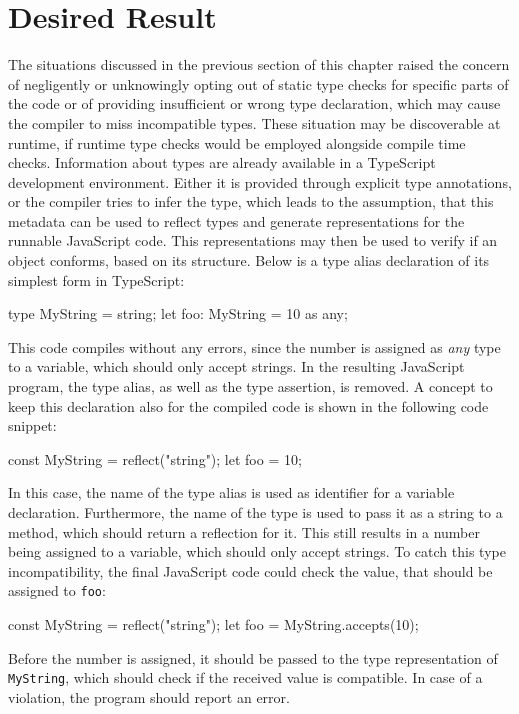 

\section{Desired Result}
\label{sec:desired-result}

The situations discussed in the previous section of this chapter raised the concern of negligently or unknowingly opting out of static type checks for specific parts of the code or of providing insufficient or wrong type declaration, which may cause the compiler to miss incompatible types. These situation may be discoverable at runtime, if runtime type checks would be employed alongside compile time checks. Information about types are already available in a TypeScript development environment. Either it is provided through explicit type annotations, or the compiler tries to infer the type, which leads to the assumption, that this metadata can be used to reflect types and generate representations for the runnable JavaScript code. This representations may then be used to verify if an object conforms, based on its structure. Below is a type alias declaration of its simplest form in TypeScript:
\begin{JsCode}[numbers=none]
type MyString = string;
let foo: MyString = 10 as any;
\end{JsCode}
This code compiles without any errors, since the number is assigned as \emph{any} type to a variable, which should only accept strings. In the resulting JavaScript program, the type alias, as well as the type assertion, is removed. A concept to keep this declaration also for the compiled code is shown in the following code snippet:
\begin{JsCode}[numbers=none]
const MyString = reflect("string");
let foo = 10;
\end{JsCode}
In this case, the name of the type alias is used as identifier for a variable declaration. Furthermore, the name of the type is used to pass it as a string to a method, which should return a reflection for it. This still results in a number being assigned to a variable, which should only accept strings. To catch this type incompatibility, the final JavaScript code could check the value, that should be assigned to \texttt{foo}:
\begin{JsCode}[numbers=none]
const MyString = reflect("string");
let foo = MyString.accepts(10);
\end{JsCode}
Before the number is assigned, it should be passed to the type representation of \texttt{MyString}, which should check if the received value is compatible. In case of a violation, the program should report an error.


